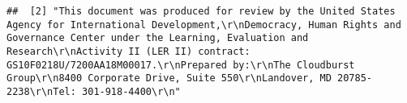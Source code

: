 \documentclass[
]{article}
\begin{document}
\begin{verbatim}
##  [2] "This document was produced for review by the United States Agency for International Development,\r\nDemocracy, Human Rights and Governance Center under the Learning, Evaluation and Research\r\nActivity II (LER II) contract: GS10F0218U/7200AA18M00017.\r\nPrepared by:\r\nThe Cloudburst Group\r\n8400 Corporate Drive, Suite 550\r\nLandover, MD 20785-2238\r\nTel: 301-918-4400\r\n"                                                                                                                                                                                                                                                                                                                                                                                                                                                                                                                                                                                                                                                                                                                                                                                                                                                                                                                                                                                                                                                                                                                                                                                                                                                                                                                                                                                                                                                                                                                                                                                                                                                                                                                                                                                                                                                                                                                                                                                                                                                                                                                                                                                                                                                                                                                                                                                                                                                                                                                                                                                                                                                                                                                                                                                                                                                                                                                                                                                                                                                    
\end{verbatim}
\end{document}
